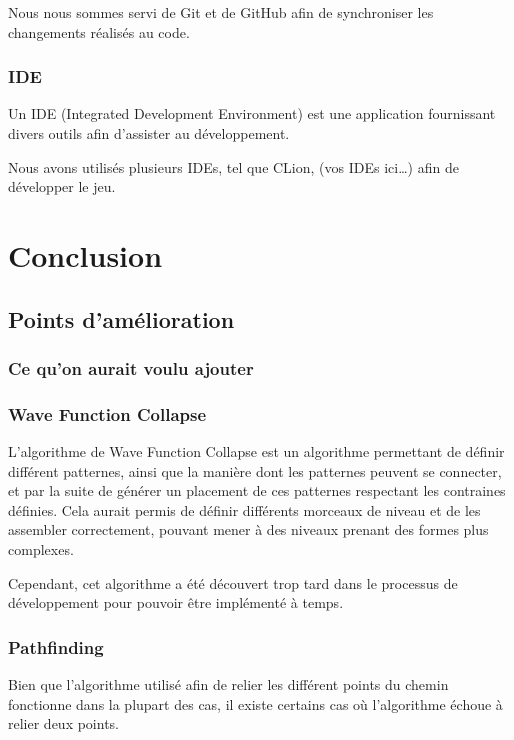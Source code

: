 \documentclass[10pt]{report}
\begin{document}
Nous nous sommes servi de Git et de GitHub afin de synchroniser les changements réalisés au code.

\subsubsection{IDE}

Un IDE (Integrated Development Environment) est une application fournissant divers outils afin d'assister au
développement.

Nous avons utilisés plusieurs IDEs, tel que CLion, (vos IDEs ici\ldots) afin de développer le jeu.

\newpage

\section{Conclusion}
\subsection{Points d'amélioration}
\subsubsection{Ce qu'on aurait voulu ajouter}
\subsubsection{Wave Function Collapse}

L'algorithme de Wave Function Collapse est un algorithme permettant de définir différent patternes, ainsi que la
manière dont les patternes peuvent se connecter, et par la suite de générer un placement de ces patternes respectant
les contraines définies.
Cela aurait permis de définir différents morceaux de niveau et de les assembler correctement, pouvant mener à des
niveaux prenant des formes plus complexes.

Cependant, cet algorithme a été découvert trop tard dans le processus de développement pour pouvoir être implémenté
à temps.  

\subsubsection{Pathfinding}

Bien que l'algorithme utilisé afin de relier les différent points du chemin fonctionne dans la plupart des cas, il
existe certains cas où l'algorithme échoue à relier deux points.
\end{document}
